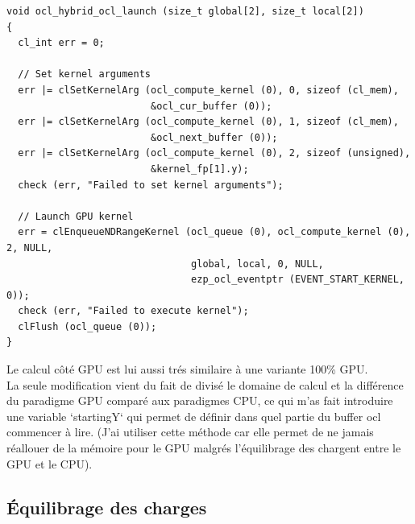 \documentclass[a4paper,12pt]{article}
\begin{document}
\begin{lstlisting}[style=cstyle, caption=Setup GPU]
void ocl_hybrid_ocl_launch (size_t global[2], size_t local[2])
{
  cl_int err = 0;

  // Set kernel arguments
  err |= clSetKernelArg (ocl_compute_kernel (0), 0, sizeof (cl_mem),
                         &ocl_cur_buffer (0));
  err |= clSetKernelArg (ocl_compute_kernel (0), 1, sizeof (cl_mem),
                         &ocl_next_buffer (0));
  err |= clSetKernelArg (ocl_compute_kernel (0), 2, sizeof (unsigned),
                         &kernel_fp[1].y);
  check (err, "Failed to set kernel arguments");

  // Launch GPU kernel
  err = clEnqueueNDRangeKernel (ocl_queue (0), ocl_compute_kernel (0), 2, NULL,
                                global, local, 0, NULL,
                                ezp_ocl_eventptr (EVENT_START_KERNEL, 0));
  check (err, "Failed to execute kernel");
  clFlush (ocl_queue (0));
}
\end{lstlisting}
Le calcul côté GPU est lui aussi trés similaire à une variante 100\% GPU.\\

La seule modification vient du fait de divisé le domaine de calcul et la différence du paradigme GPU comparé aux paradigmes CPU, ce qui m'as fait introduire une variable `startingY` qui permet de définir dans quel partie du buffer ocl commencer à lire. (J'ai utiliser cette méthode car elle permet de ne jamais réallouer de la mémoire pour le GPU malgrés l'équilibrage des chargent entre le GPU et le CPU).

\newpage
\subsection{Équilibrage des charges}
\end{document}
